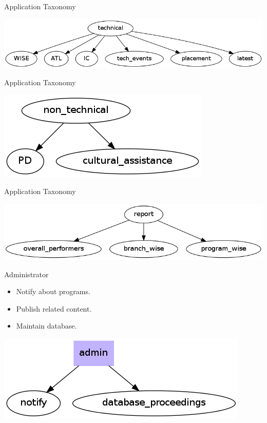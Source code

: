 \documentclass[14pt]{beamer}
\begin{document}
\begin{frame}{Application Taxonomy}
	\begin{center}
	\includegraphics[scale = 0.38]{tech.png}
	\end{center}
\end{frame}

\begin{frame}{Application Taxonomy}
	\begin{center}
	\includegraphics[scale = 0.5]{nontech.png}
	\end{center}
\end{frame}

\begin{frame}{Application Taxonomy}
	\begin{center}
	\includegraphics[scale = 0.4]{report.png}
	\end{center}
\end{frame}

\begin{frame}{Administrator}
	\begin{itemize}
		\item Notify about programs.
		\item Publish related content.
		\item Maintain database.
	\end{itemize}
	\begin{center}
	\includegraphics[scale=0.5]{admin.png}
	\end{center}
\end{frame}
\end{document}
